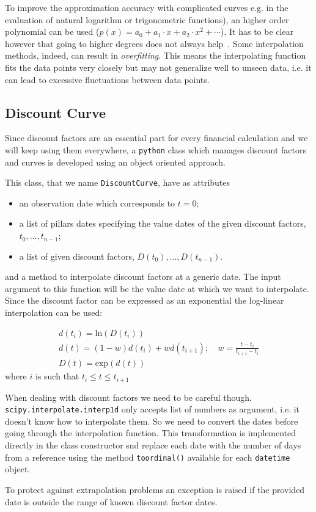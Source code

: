 To improve the approximation accuracy with complicated curves e.g. in the evaluation of natural logarithm or trigonometric functions), an higher order polynomial can be used ($p(x)=a_0 + a_1\cdot x + a_2\cdot x^2+\cdots$). It has to be clear however that going to higher degrees does not always help~\cite{bib:runge}.
Some interpolation methods, indeed, can result in \emph{overfitting}. This means the interpolating function fits the data points very closely but may not generalize well to unseen data, i.e. it can lead to excessive fluctuations between data points.

\subsection{Discount Curve}

\begin{finmarkets}
Since discount factors are an essential part for every financial calculation and we will keep using them everywhere, a \texttt{python} class which manages discount factors and curves is developed using an object oriented approach.

This class, that we name \texttt{DiscountCurve}, have as attributes
\begin{itemize}
	\tightlist
    \item an observation date which corresponds to $t=0$;
	\item a list of pillars dates specifying the value dates of the given discount factors, $t_0,...,t_{n-1}$;
	\item a list of given discount factors, $D(t_0),...,D(t_{n-1})$.
\end{itemize}

and a method to interpolate discount factors at a generic date. The input argument to this function will be the value date at which we want to interpolate. Since the discount factor can be expressed as an exponential the log-linear interpolation can be used:

\begin{equation}
	\begin{gathered}
		d(t_i)=\mathrm{ln}(D(t_i))\\
		d(t) = (1-w)d(t_i) + wd(t_{i+1});\quad w=\frac{t-t_i}{t_{i+1}-t_i}\\
		D(t) = \mathrm{exp}(d(t))
	\end{gathered}
\end{equation}
where $i$ is such that $t_i \le t \le t_{i+1}$

When dealing with discount factors we need to be careful though. \texttt{scipy.interpolate.interp1d} only accepts list of numbers as argument, i.e. it doesn't know how to interpolate them. So we need to convert the dates before going through the interpolation function. This transformation is implemented directly in the class constructor snd replace each date with the number of days from a reference using the method \texttt{toordinal()} available for each \texttt{datetime} object.

To protect against extrapolation problems an exception is raised if the provided date is outside the range of known discount factor dates.
\end{finmarkets}

